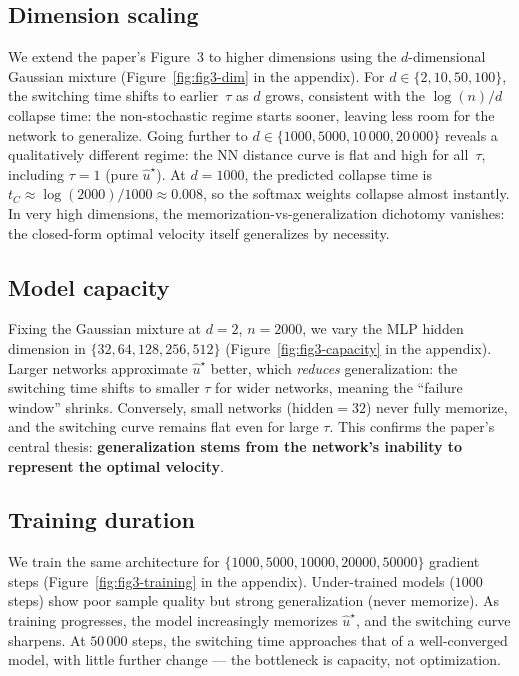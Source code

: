 \documentclass[10pt,a4paper]{article}
\theoremstyle{definition}
\begin{document}
\subsection{Dimension scaling}

We extend the paper's Figure~3 to higher dimensions using the $d$-dimensional Gaussian mixture (Figure~\ref{fig:fig3-dim} in the appendix).
For $d \in \{2, 10, 50, 100\}$, the switching time shifts to earlier~$\tau$ as $d$ grows, consistent with the $\log(n)/d$ collapse time: the non-stochastic regime starts sooner, leaving less room for the network to generalize.
Going further to $d \in \{1000, 5000, 10\,000, 20\,000\}$ reveals a qualitatively different regime: the NN distance curve is flat and high for all~$\tau$, including $\tau = 1$ (pure $\hat{u}^\star$).
At $d = 1000$, the predicted collapse time is $t_C \approx \log(2000)/1000 \approx 0.008$, so the softmax weights collapse almost instantly.
In very high dimensions, the memorization-vs-generalization dichotomy vanishes: the closed-form optimal velocity itself generalizes by necessity.

\subsection{Model capacity}

Fixing the Gaussian mixture at $d = 2$, $n = 2000$, we vary the MLP hidden dimension in $\{32, 64, 128, 256, 512\}$ (Figure~\ref{fig:fig3-capacity} in the appendix).
Larger networks approximate $\hat{u}^\star$ better, which \emph{reduces} generalization: the switching time shifts to smaller $\tau$ for wider networks, meaning the ``failure window'' shrinks.
Conversely, small networks ($\mathrm{hidden} = 32$) never fully memorize, and the switching curve remains flat even for large $\tau$.
This confirms the paper's central thesis: \textbf{generalization stems from the network's inability to represent the optimal velocity}.

\subsection{Training duration}

We train the same architecture for $\{1000, 5000, 10000, 20000, 50000\}$ gradient steps (Figure~\ref{fig:fig3-training} in the appendix).
Under-trained models ($1000$ steps) show poor sample quality but strong generalization (never memorize).
As training progresses, the model increasingly memorizes $\hat{u}^\star$, and the switching curve sharpens.
At $50\,000$ steps, the switching time approaches that of a well-converged model, with little further change --- the bottleneck is capacity, not optimization.
\end{document}
